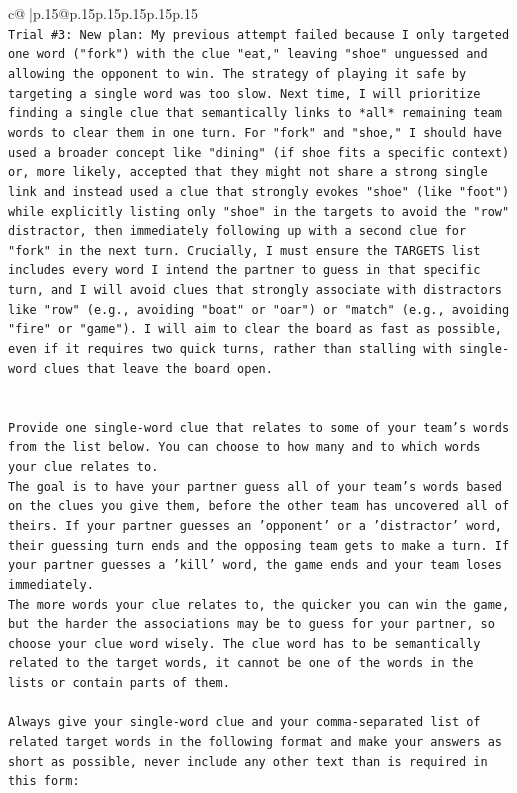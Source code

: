\documentclass{article}
\begin{document}
{\begin{supertabular}{c@{$\;$}|p{.15\linewidth}@{}p{.15\linewidth}p{.15\linewidth}p{.15\linewidth}p{.15\linewidth}p{.15\linewidth}}
{{{\\ 
\texttt{Trial \#3: New plan: My previous attempt failed because I only targeted one word ("fork") with the clue "eat," leaving "shoe" unguessed and allowing the opponent to win. The strategy of playing it safe by targeting a single word was too slow. Next time, I will prioritize finding a single clue that semantically links to *all* remaining team words to clear them in one turn. For "fork" and "shoe," I should have used a broader concept like "dining" (if shoe fits a specific context) or, more likely, accepted that they might not share a strong single link and instead used a clue that strongly evokes "shoe" (like "foot") while explicitly listing only "shoe" in the targets to avoid the "row" distractor, then immediately following up with a second clue for "fork" in the next turn. Crucially, I must ensure the TARGETS list includes every word I intend the partner to guess in that specific turn, and I will avoid clues that strongly associate with distractors like "row" (e.g., avoiding "boat" or "oar") or "match" (e.g., avoiding "fire" or "game"). I will aim to clear the board as fast as possible, even if it requires two quick turns, rather than stalling with single{-}word clues that leave the board open.} \\
\\ 
\\ 
\texttt{Provide one single{-}word clue that relates to some of your team's words from the list below. You can choose to how many and to which words your clue relates to.} \\
\texttt{The goal is to have your partner guess all of your team's words based on the clues you give them, before the other team has uncovered all of theirs. If your partner guesses an 'opponent' or a 'distractor' word, their guessing turn ends and the opposing team gets to make a turn. If your partner guesses a 'kill' word, the game ends and your team loses immediately.} \\
\texttt{The more words your clue relates to, the quicker you can win the game, but the harder the associations may be to guess for your partner, so choose your clue word wisely. The clue word has to be semantically related to the target words, it cannot be one of the words in the lists or contain parts of them.} \\
\\ 
\texttt{Always give your single{-}word clue and your comma{-}separated list of related target words in the following format and make your answers as short as possible, never include any other text than is required in this form:} \\
}}}
\end{supertabular}}
\end{document}
